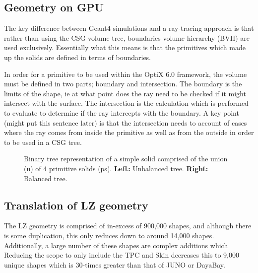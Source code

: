 \subsection{Geometry on GPU}
\par
The key difference between Geant4 simulations and a ray-tracing approach is that rather than using the CSG volume tree, boundaries volume hierarchy (BVH) are used exclusively.
Essentially what this means is that the primitives which made up the solids are defined in terms of boundaries.

\par
In order for a primitive to be used within the OptiX 6.0 framework, the volume must be defined in two parts; boundary and intersection.
The boundary is the limits of the shape, ie at what point does the ray need to be checked if it might intersect with the surface.
The intersection is the calculation which is performed to evaluate to determine if the ray intercepts with the boundary.
A key point (might put this sentence later) is that the intersection needs to account of cases where the ray comes from inside the primitive as well as from the outside in order to be used in a CSG tree.


\begin{figure}[!htpb]
\centering 
{}
\caption{Binary tree representation of a simple solid comprised of the union (u) of 4 primitive solids (ps). \textbf{Left:} Unbalanced tree. \textbf{Right:} Balanced tree.}
\label{fig:UnionSolidBinaryTree}
\end{figure}

\subsection{Translation of LZ geometry}
\par
The LZ geometry is comprised of in-excess of 900,000 shapes, and although there is some duplication, this only reduces down to around 14,000 shapes.
Additionally, a large number of these shapes are complex additions which 
Reducing the scope to only include the TPC and Skin decreases this to 9,000 unique shapes which is 30-times greater than that of JUNO or DayaBay.


